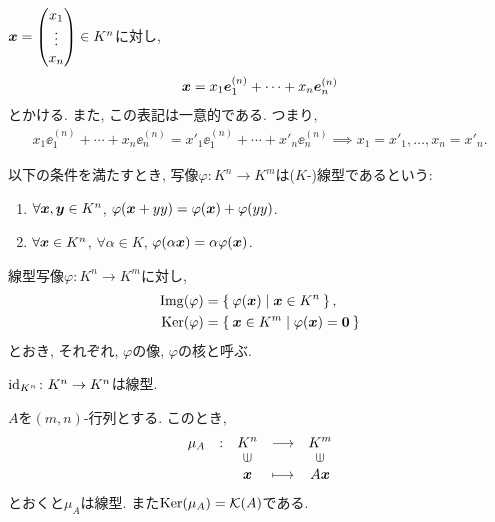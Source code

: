 $\boldsymbol{x}=\begin{pmatrix}x_1\\\vdots\\x_n\end{pmatrix}\in K^n$に対し,
\begin{align*}
  \boldsymbol{x}=x_1\boldsymbol{e}_1^{(n)}+\cdots+x_n\boldsymbol{e}_n^{(n)}
\end{align*}
とかける.
また, この表記は一意的である.  つまり,
\begin{align*}
  x_1\ee_1^{(n)}+\cdots+x_n\ee_n^{(n)}
  =x'_1\ee_1^{(n)}+\cdots+x'_n\ee_n^{(n)}
  \implies x_1=x'_1,\ldots,x_n=x'_n.
\end{align*}
\begin{definition}
  以下の条件を満たすとき,
  写像$\varphi\colon K^n\to K^m$は($K$-)線型であるという:
  \begin{enumerate}
    \item $\forall \boldsymbol{x},\boldsymbol{y}\in K^n$, $\varphi(\boldsymbol{x}+yy)=\varphi(\boldsymbol{x})+\varphi(yy)$.
    \item $\forall \boldsymbol{x}\in K^n$, $\forall \alpha\in K$, $\varphi(\alpha\boldsymbol{x})=\alpha\varphi(\boldsymbol{x})$.
  \end{enumerate}
\end{definition}

\begin{definition}
  線型写像$\varphi\colon K^n\to K^m$に対し,
  \begin{align*}
    \operatorname{Img}(\varphi)&=\Set{\varphi(\boldsymbol{x})|\boldsymbol{x}\in K^n},\\
    \operatorname{Ker}(\varphi)&=\Set{\boldsymbol{x}\in K^m|\varphi(\boldsymbol{x})=\boldsymbol{0}}
  \end{align*}
  とおき, それぞれ, $\varphi$の像, $\varphi$の核と呼ぶ.
\end{definition}

\begin{example}
  $\operatorname{id}_{K^n}\colon K^n\to K^n$は線型.
\end{example}
\begin{example}
  $A$を$(m,n)$-行列とする.
  このとき,
  \begin{align*}
    \shazo{\mu_A}
          {K^n}{K^m}
          {\xx}{A\xx}
  \end{align*}
  とおくと$\mu_A$は線型.
  また$\operatorname{Ker}(\mu_A)=\mathcal{K}(A)$である.
\end{example}

